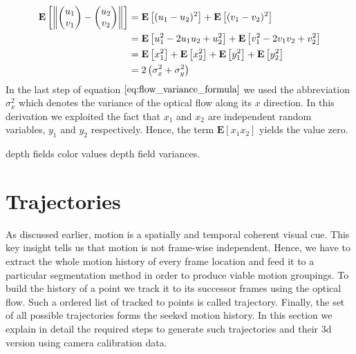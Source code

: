 \begin{equation}
\begin{aligned}
\mathbf{E} \left[ \norm{\colvec{u_1}{v_1} - \colvec{u_2}{v_2}} \right]
& = \mathbf{E} \left[ (u_1 - u_2)^2 \right] + \mathbf{E} \left[ (v_1 - v_2)^2 \right] \\
& = \mathbf{E} \left[ u_1^2 - 2 u_1 u_2 + u_2^2 \right] + \mathbf{E} \left[ v_1^2 - 2 v_1 v_2 + v_2^2 \right] \\
& = \mathbf{E} \left[ x_1^2 \right] + \mathbf{E} \left[ x_2^2 \right] + \mathbf{E} \left[ y_1^2 \right] + \mathbf{E} \left[ y_2^2 \right] \\
& = 2 \left( \sigma_x^2 + \sigma_y^2 \right)
\end{aligned}
\label{eq:flow_variance_formula}	
\end{equation}
In the last step of equation $\ref{eq:flow_variance_formula}$ we used the abbreviation $\sigma_x^2$ which denotes the variance of the optical flow along its $x$ direction. In this derivation we exploited the fact that $x_1$ and $x_2$ are independent random variables, $y_1$ and $y_2$ respectively. Hence, the term $\mathbf{E} \left[ x_1 x_2\right]$ yields the value zero.


depth fields
color values
depth field variances.



\section{Trajectories}
As discussed earlier, motion is a spatially and temporal coherent visual cue. This key insight tells us that motion is not frame-wise independent. Hence, we have to extract the whole motion history of every frame location and feed it to a particular segmentation method in order to produce viable motion groupings. To build the history of a point we track it to its successor frames using the optical flow. Such a ordered list of tracked to points is called trajectory. Finally, the set of all possible trajectories forms the seeked motion history. In this section we explain in detail the required steps to generate such trajectories and their 3d version using camera calibration data.


